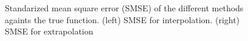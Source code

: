 \documentclass[]{interact}
\theoremstyle{plain}%
\theoremstyle{definition}
\theoremstyle{remark}
\begin{document}
\begin{figure}[H]
\centering
{}
\caption{Standarized mean square error (SMSE) of the different methods againts the true function. (left) SMSE for interpolation. (right) SMSE for extrapolation}
  \label{fig11_MSE_exI_inter}
\end{figure}
\end{document}
